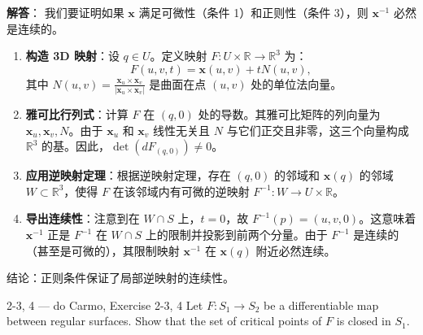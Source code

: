 \begin{solution}
\textbf{解答}：
我们要证明如果 $\mathbf{x}$ 满足可微性（条件 1）和正则性（条件 3），则 $\mathbf{x}^{-1}$ 必然是连续的。

\begin{enumerate}
    \item \textbf{构造 3D 映射}：设 $q \in U$。定义映射 $F: U \times \mathbb{R} \to \mathbb{R}^3$ 为：
    \[
    F(u, v, t) = \mathbf{x}(u, v) + t N(u, v),
    \]
    其中 $N(u, v) = \frac{\mathbf{x}_u \times \mathbf{x}_v}{|\mathbf{x}_u \times \mathbf{x}_v|}$ 是曲面在点 $(u, v)$ 处的单位法向量。
    \item \textbf{雅可比行列式}：计算 $F$ 在 $(q, 0)$ 处的导数。其雅可比矩阵的列向量为 $\mathbf{x}_u, \mathbf{x}_v, N$。由于 $\mathbf{x}_u$ 和 $\mathbf{x}_v$ 线性无关且 $N$ 与它们正交且非零，这三个向量构成 $\mathbb{R}^3$ 的基。因此，$\det(dF_{(q,0)}) \neq 0$。
    \item \textbf{应用逆映射定理}：根据逆映射定理，存在 $(q, 0)$ 的邻域和 $\mathbf{x}(q)$ 的邻域 $W \subset \mathbb{R}^3$，使得 $F$ 在该邻域内有可微的逆映射 $F^{-1}: W \to U \times \mathbb{R}$。
    \item \textbf{导出连续性}：注意到在 $W \cap S$ 上，$t = 0$，故 $F^{-1}(p) = (u, v, 0)$。这意味着 $\mathbf{x}^{-1}$ 正是 $F^{-1}$ 在 $W \cap S$ 上的限制并投影到前两个分量。由于 $F^{-1}$ 是连续的（甚至是可微的），其限制映射 $\mathbf{x}^{-1}$ 在 $\mathbf{x}(q)$ 附近必然连续。
\end{enumerate}
结论：正则条件保证了局部逆映射的连续性。
\end{solution}

\begin{exercise}{2-3, 4 — do Carmo, Exercise 2-3, 4}
Let $F: S_1 \to S_2$ be a differentiable map between regular surfaces. Show that the set of critical points of $F$ is closed in $S_1$.
\end{exercise}

